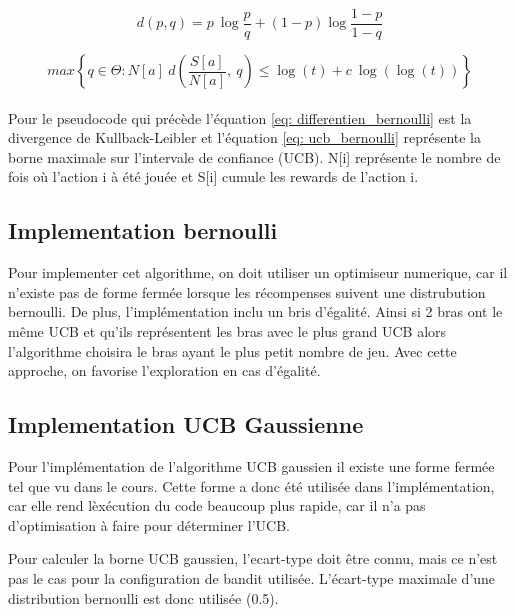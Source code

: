 \documentclass[letterpaper,11pt]{article}
\begin{document}
\begin{equation}
\label{eq: differentien_bernoulli}
d(p,q) = p~ \log \frac{p}{q} + (1-p) \log \frac{1-p}{1-q}
\end{equation}

\begin{equation}
\label{eq: ucb_bernoulli}
max \left\{ q \in \Theta : N[a]~d\left(\frac{S[a]}{N[a]}, ~q\right) \leq \log(t) + c ~ \log(\log(t)) \right\}
\end{equation}
\\

Pour le pseudocode qui précède l'équation \ref{eq: differentien_bernoulli} est la divergence de Kullback-Leibler et l'équation \ref{eq: ucb_bernoulli} représente la borne maximale sur l'intervale de confiance (UCB). N[i] représente le nombre de fois où l'action i à été jouée et S[i] cumule les rewards de l'action i.

\subsection{Implementation bernoulli}

Pour implementer cet algorithme, on doit utiliser un optimiseur numerique, car il n'existe pas de forme fermée lorsque les récompenses suivent une distrubution bernoulli.
De plus, l'implémentation inclu un bris d'égalité.
Ainsi si 2 bras ont le même UCB et qu'ils représentent les bras avec le plus grand UCB alors l'algorithme choisira le bras ayant le plus petit nombre de jeu. Avec cette approche, on favorise l'exploration en cas d'égalité.

\subsection{Implementation UCB Gaussienne}

Pour l'implémentation de l'algorithme UCB gaussien il existe une forme fermée tel que vu dans le cours.
Cette forme a donc été utilisée dans l'implémentation, car elle rend lèxécution du code beaucoup plus rapide, car il n'a pas d'optimisation à faire pour déterminer l'UCB.

Pour calculer la borne UCB gaussien, l'ecart-type doit être connu, mais ce n'est pas le cas pour la configuration de bandit utilisée.
L'écart-type maximale d'une distribution bernoulli est donc utilisée (0.5).
\end{document}
